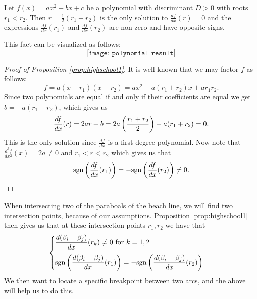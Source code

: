 \begin{prop} \label{prop:highschool1}
Let $f(x) = a x^2 + b x + c$ be a polynomial with discriminant $D > 0$ with roots $r_1 < r_2$. Then $r = \tfrac{1}{2}(r_1 + r_2)$ is the only solution to $\displaystyle\frac{df}{dx}(r) = 0$ and the expressions $\displaystyle\frac{df}{dx}(r_1)$ and $\displaystyle\frac{df}{dx}(r_2)$ are non-zero and have opposite signs.
\end{prop}
This fact can be visualized as follows:
\[
    \texttt{[image: polynomial\_result]}
\]
\begin{proof}[Proof of Proposition \ref{prop:highschool1}]
It is well-known that we may factor $f$ as follows:
\[
    f = a (x - r_1) (x - r_2) = a x^2 - a(r_1 + r_2) x + a r_1 r_2.
\]
Since two polynomials are equal if and only if their coefficients are equal we get $b = - a (r_1 + r_2)$, which gives us
\[
    \frac{df}{dx} (r) = 2 a r + b = 2 a \left(\frac{r_1 + r_2}{2}\right) - a (r_1 + r_2) = 0.
\]
This is the only solution since $\displaystyle\frac{df}{dx}$ is a first degree polynomial. Now note that $\displaystyle\frac{d^2 f}{d x^2}(x) = 2a \ne 0$ and $r_1 < r < r_2$ which gives us that
\[
    \text{sgn} \left(\frac{df}{dx}(r_1)\right) = -\text{sgn} \left(\frac{df}{dx}(r_2)\right) \ne 0.
\]
\end{proof}
When intersecting two of the paraboals of the beach line, we will find two intersection points, because of our assumptions. Proposition \ref{prop:highschool1} then gives us that at these intersection points $r_1, r_2$ we have that
\[
    \begin{cases}
        \displaystyle\frac{d(\beta_i - \beta_j)}{dx}(r_k) \ne 0 \text{ for } k = 1, 2 & \text{ }\vspace{0.25cm} \\ \text{sgn} \para{\displaystyle\frac{d(\beta_i - \beta_j)}{dx}(r_1)} = -\text{sgn} \para{\displaystyle\frac{d(\beta_i - \beta_j)}{dx}(r_2)} & \text{ }
    \end{cases}
\]
We then want to locate a specific breakpoint between two arcs, and the above will help us to do this.

